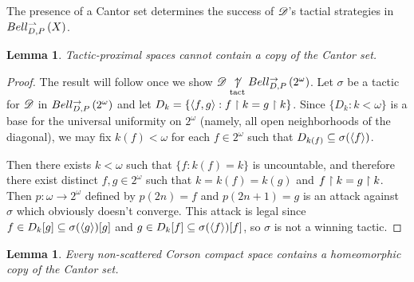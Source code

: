 \documentclass{amsart}
\newtheorem{lemma}[theorem]{Lemma}
\theoremstyle{definition}
\begin{document}
  The presence of a Cantor set determines the success of \(\mathscr{D}\)'s
  tactial strategies in \(Bell_{D,P}^{\rightharpoonup}\left({X}\right)\).

  \begin{lemma}
    Tactic-proximal spaces cannot contain a copy of the Cantor set.
  \end{lemma}

  \begin{proof}
    The result will follow once we show
    \(\mathscr{D}\underset{\text{tact}}{\not\uparrow}Bell_{D,P}^{\to}\left({2^\omega}\right)\).
    Let \(\sigma\) be a tactic for \(\mathscr{D}\) in \(Bell_{D,P}^{\to}\left({2^\omega}\right)\)
    and let \(D_k=\{\langle f,g\rangle:f\restriction k = g\restriction k\}\). Since \(\{D_k:k<\omega\}\)
    is a base for the universal uniformity on \(2^\omega\)
    (namely, all open neighborhoods of the diagonal),
    we may fix \(k(f)<\omega\)
    for each \(f\in2^\omega\) such that \(D_{k(f)}\subseteq\sigma(\langle f\rangle)\).

    Then there exists \(k<\omega\) such that \(\{f:k(f)=k\}\) is uncountable,
    and therefore there exist distinct \(f,g\in2^\omega\)
    such that \(k=k(f)=k(g)\) and
    \(f\restriction k=g\restriction k\). Then \(p:\omega\to2^\omega\) defined by
    \(p(2n)=f\) and \(p(2n+1)=g\) is an attack against \(\sigma\) which
    obviously doesn't converge. This attack is legal since
    \(f\in D_k[g]\subseteq\sigma(\langle g\rangle)[g]\) and
    \(g\in D_k[f]\subseteq\sigma(\langle f\rangle)[f]\), so \(\sigma\) is not a winning
    tactic.
  \end{proof}

  \begin{lemma}
    Every non-scattered Corson compact space contains a homeomorphic
    copy of the Cantor set.
  \end{lemma}
\end{document}
